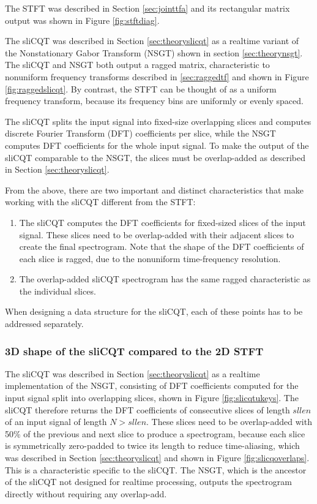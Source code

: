 \documentclass[report.tex]{subfiles}
\begin{document}
The STFT was described in Section \ref{sec:jointtfa} and its rectangular matrix output was shown in Figure \ref{fig:stftdiag}.

The sliCQT was described in Section \ref{sec:theoryslicqt} as a realtime variant of the Nonstationary Gabor Transform (NSGT) shown in section \ref{sec:theorynsgt}. The sliCQT and NSGT both output a ragged matrix, characteristic to nonuniform frequency transforms described in \ref{sec:raggedtf} and shown in Figure \ref{fig:raggedslicqt}. By contrast, the STFT can be thought of as a uniform frequency transform, because its frequency bins are uniformly or evenly spaced.

The sliCQT splits the input signal into fixed-size overlapping slices and computes discrete Fourier Transform (DFT) coefficients per slice, while the NSGT computes DFT coefficients for the whole input signal. To make the output of the sliCQT comparable to the NSGT, the slices must be overlap-added as described in Section \ref{sec:theoryslicqt}.

From the above, there are two important and distinct characteristics that make working with the sliCQT different from the STFT:
\begin{enumerate}
	\item
		The sliCQT computes the DFT coefficients for fixed-sized slices of the input signal. These slices need to be overlap-added with their adjacent slices to create the final spectrogram. Note that the shape of the DFT coefficients of each slice is ragged, due to the nonuniform time-frequency resolution.
	\item
		The overlap-added sliCQT spectrogram has the same ragged characteristic as the individual slices.
\end{enumerate}

When designing a data structure for the sliCQT, each of these points has to be addressed separately. 

\subsubsection{3D shape of the sliCQT compared to the 2D STFT}
\label{sec:stftslicqtcomp1}

The sliCQT was described in Section \ref{sec:theoryslicqt} as a realtime implementation of the NSGT, consisting of DFT coefficients computed for the input signal split into overlapping slices, shown in Figure \ref{fig:slicqtukeys}. The sliCQT therefore returns the DFT coefficients of consecutive slices of length $sllen$ of an input signal of length $N > sllen$. These slices need to be overlap-added with 50\% of the previous and next slice to produce a spectrogram, because each slice is symmetrically zero-padded to twice its length to reduce time-aliasing, which was described in Section \ref{sec:theoryslicqt} and shown in Figure \ref{fig:slicqoverlaps}. This is a characteristic specific to the sliCQT. The NSGT, which is the ancestor of the sliCQT not designed for realtime processing, outputs the spectrogram directly without requiring any overlap-add.
\end{document}

